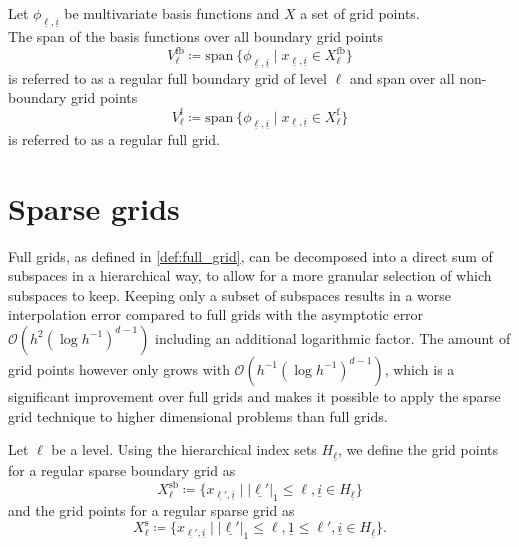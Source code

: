 \documentclass[
  a4paper,  %
  twoside,  %
  bibliography=totoc,
  headsepline,
  cleardoublepage=empty,
  parskip=half,
  draft=false
]{scrbook}
\begin{document}
\begin{definition}
Let $\phi_{\underline{\ell},\underline{i}}$ be multivariate basis functions and $X$ a set of grid points.\\
The span of the basis functions over all boundary grid points
\begin{equation}
V^{\text{fb}}_{\ell} \coloneqq \text{span}~ \{\phi_{\underline{\ell},\underline{i}} \mid x_{\underline{\ell},\underline{i}} \in X^{\text{fb}}_{\ell}\}
\end{equation}
is referred to as a regular full boundary grid of level $\ell$ and span over all non-boundary grid points
\begin{equation}
V^{\text{f}}_{\ell} \coloneqq \text{span}~ \{\phi_{\underline{\ell},\underline{i}} \mid x_{\underline{\ell},\underline{i}} \in X^{\text{f}}_{\ell}\}
\end{equation}
is referred to as a regular full grid.

\label{def:full_grid}
\end{definition}


\section{Sparse grids}

Full grids, as defined in \cref{def:full_grid}, can be decomposed into a direct sum of subspaces in a hierarchical way, to allow for a more granular selection of which subspaces to keep.
Keeping only a subset of subspaces results in a worse interpolation error compared to full grids with the asymptotic error $\mathcal{O}(h^2 (\log h^{-1})^{d-1})$ including an additional logarithmic factor.
The amount of grid points however only grows with $\mathcal{O}(h^{-1} (\log h^{-1})^{d-1})$, which is a significant improvement over full grids and makes it possible to apply the sparse grid technique to higher dimensional problems than full grids.
\begin{definition}
Let $\ell$ be a level. Using the hierarchical index sets $H_{\underline{\ell}}$, we define the grid points for a regular sparse boundary grid as
\begin{equation}
X^{\text{sb}}_{\ell} \coloneqq \{x_{\underline{\ell'},\underline{i}} \mid |\underline{\ell'}|_1 \leq \ell, \underline{i} \in H_{\underline{\ell}}\}
\end{equation}
and the grid points for a regular sparse grid as
\begin{equation}
X^{\text{s}}_{\ell} \coloneqq \{x_{\underline{\ell'},\underline{i}} \mid |\underline{\ell'}|_1 \leq \ell, \underline{1} \leq \ell', \underline{i} \in H_{\underline{\ell}}\}.
\end{equation}
\end{definition}
\end{document}
